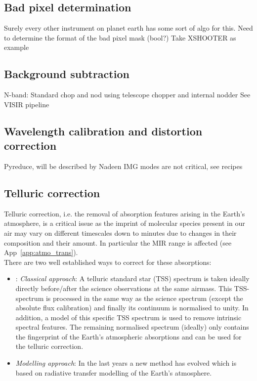 \subsection{Bad pixel determination}

Surely every other instrument on planet earth has some sort of algo for this.
Need to determine the format of the bad pixel mask (bool?)
Take XSHOOTER as example

\subsection{Background subtraction}

N-band: Standard chop and nod using telescope chopper and internal nodder
See VISIR pipeline

\subsection{Wavelength calibration and distortion correction}

Pyreduce, will be described by Nadeen
IMG modes are not critical, see recipes

\subsection{Telluric correction}
Telluric correction, i.e. the removal of absorption features arising in the Earth's atmosphere, is a critical issue as the imprint of molecular species present in our air may vary on different timescales down to minutes due to changes in their composition and their amount. In particular the \ac{MIR} range is affected (see App~\ref{app:atmo_trans}).\\
There are two well established ways to correct for these absorptions:
\begin{itemize}
    \item: \textit{Classical approach}: A telluric standard star (\ac{TSS}) spectrum is taken ideally directly before/after the science observations at the same airmass. This \ac{TSS}-spectrum is processed in the same way as the science spectrum (except the absolute flux calibration) and finally its continuum is normalised to unity. In addition, a model of this specific \ac{TSS} spectrum is used to remove intrinsic spectral features. The remaining normalised spectrum (ideally) only contains the fingerprint of the Earth's atmospheric absorptions and can be used for the telluric correction.
    \item \textit{Modelling approach}: In the last years a new method has evolved which is based on radiative transfer modelling of the Earth's atmosphere. 
\end{itemize}

